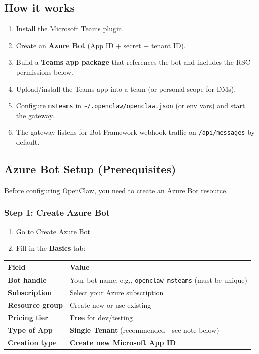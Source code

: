\subsection{How it works}


\begin{enumerate}
  \item Install the Microsoft Teams plugin.
  \item Create an \textbf{Azure Bot} (App ID + secret + tenant ID).
  \item Build a \textbf{Teams app package} that references the bot and includes the RSC permissions below.
  \item Upload/install the Teams app into a team (or personal scope for DMs).
  \item Configure \texttt{msteams} in \texttt{\textasciitilde{}/.openclaw/openclaw.json} (or env vars) and start the gateway.
  \item The gateway listens for Bot Framework webhook traffic on \texttt{/api/messages} by default.
\end{enumerate}


\subsection{Azure Bot Setup (Prerequisites)}


Before configuring OpenClaw, you need to create an Azure Bot resource.

\subsubsection{Step 1: Create Azure Bot}


\begin{enumerate}
  \item Go to \href{https://portal.azure.com/\#create/Microsoft.AzureBot}{Create Azure Bot}
  \item Fill in the \textbf{Basics} tab:
\end{enumerate}



\begin{table}[h]
\centering
\small
\begin{tabular}{|l|l|}
\hline
Field & Value \\
\hline
\textbf{Bot handle} & Your bot name, e.g., \texttt{openclaw-msteams} (must be unique) \\
\hline
\textbf{Subscription} & Select your Azure subscription \\
\hline
\textbf{Resource group} & Create new or use existing \\
\hline
\textbf{Pricing tier} & \textbf{Free} for dev/testing \\
\hline
\textbf{Type of App} & \textbf{Single Tenant} (recommended - see note below) \\
\hline
\textbf{Creation type} & \textbf{Create new Microsoft App ID} \\
\hline
\end{tabular}
\end{table}



